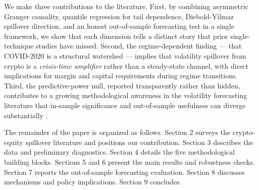 \documentclass[11pt,a4paper]{article}
\begin{document}
We make three contributions to the literature. First, by combining asymmetric Granger causality, quantile regression for tail dependence, Diebold-Yilmaz spillover direction, and an honest out-of-sample forecasting test in a single framework, we show that each dimension tells a distinct story that prior single-technique studies have missed. Second, the regime-dependent finding --- that COVID-2020 is a structural watershed --- implies that volatility spillover from crypto is a \emph{crisis-time amplifier} rather than a steady-state channel, with direct implications for margin and capital requirements during regime transitions. Third, the predictive-power null, reported transparently rather than hidden, contributes to a growing methodological awareness in the volatility forecasting literature that in-sample significance and out-of-sample usefulness can diverge substantially \citep{harvey2016, conrad2020}.

The remainder of the paper is organized as follows. Section 2 surveys the crypto-equity spillover literature and positions our contribution. Section 3 describes the data and preliminary diagnostics. Section 4 details the five methodological building blocks. Sections 5 and 6 present the main results and robustness checks. Section 7 reports the out-of-sample forecasting evaluation. Section 8 discusses mechanisms and policy implications. Section 9 concludes.
\end{document}
